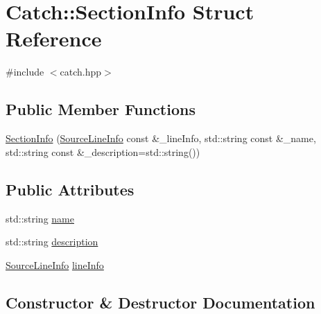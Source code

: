 \hypertarget{struct_catch_1_1_section_info}{}\section{Catch\+:\+:Section\+Info Struct Reference}
\label{struct_catch_1_1_section_info}


{\ttfamily \#include $<$catch.\+hpp$>$}

\subsection*{Public Member Functions}
\begin{DoxyCompactItemize}
\item 
\mbox{\hyperlink{struct_catch_1_1_section_info_a27aff3aaf8b6611f3651b17111a272c6}{Section\+Info}} (\mbox{\hyperlink{struct_catch_1_1_source_line_info}{Source\+Line\+Info}} const \&\+\_\+line\+Info, std\+::string const \&\+\_\+name, std\+::string const \&\+\_\+description=std\+::string())
\end{DoxyCompactItemize}
\subsection*{Public Attributes}
\begin{DoxyCompactItemize}
\item 
std\+::string \mbox{\hyperlink{struct_catch_1_1_section_info_a704c8fc662d309137e0d4f199cb7df58}{name}}
\item 
std\+::string \mbox{\hyperlink{struct_catch_1_1_section_info_a0052060219a6de74bb7ade34d4163a4e}{description}}
\item 
\mbox{\hyperlink{struct_catch_1_1_source_line_info}{Source\+Line\+Info}} \mbox{\hyperlink{struct_catch_1_1_section_info_adbc83b8a3507c4acc8ee249e93465711}{line\+Info}}
\end{DoxyCompactItemize}


\subsection{Constructor \& Destructor Documentation}
\mbox{\label{struct_catch_1_1_section_info_a27aff3aaf8b6611f3651b17111a272c6}} 
